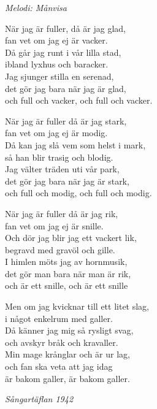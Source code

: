 {\footnotesize\textit{Melodi: Månvisa}}\par
\vspace{10pt}
När jag är fuller, då är jag glad,\\
fan vet om jag ej är vacker.\\
Då går jag runt i vår lilla stad,\\
ibland lyxhus och baracker.\\
Jag sjunger stilla en serenad,\\
det gör jag bara när jag är glad,\\
och full och vacker, och full och vacker.\par
\vspace{10pt}
När jag är fuller då är jag stark,\\
fan vet om jag ej är modig.\\
Då kan jag slå vem som helst i mark,\\
så han blir trasig och blodig.\\
Jag välter träden uti vår park,\\
det gör jag bara när jag är stark,\\
och full och modig, och full och modig.\par
\newpage
När jag är fuller då är jag rik,\\
fan vet om jag ej är snille.\\
Och dör jag blir jag ett vackert lik,\\
begravd med gravöl och gille.\\
I himlen möts jag av hornmusik,\\
det gör man bara när man är rik,\\
och är ett snille, och är ett snille\par
\vspace{10pt}
Men om jag kvicknar till ett litet slag,\\
i något enkelrum med galler.\\
Då känner jag mig så rysligt svag,\\
och avskyr bråk och kravaller.\\
Min mage krånglar och är ur lag,\\
och fan ska veta att jag idag\\
är bakom galler, är bakom galler.\par
\vspace{10pt}
{\footnotesize\textit{Sångartäflan 1942}}
